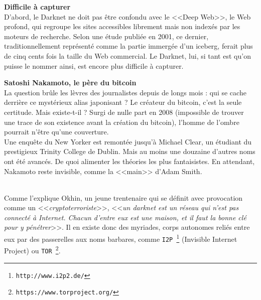 \documentclass[11pt,twoside,a4paper]{article}
\begin{document}
\begin{minipage}[ht]{0.40\textwidth}
	\textbf{\large Difficile {\`a} capturer}~\\

	D'abord, le Darknet ne doit pas {\^e}tre confondu avec le <<Deep Web>>, le Web profond, qui regroupe les sites accessibles librement mais non index{\'e}s par les moteurs de recherche. Selon une {\'e}tude publi{\'e}e en 2001, ce dernier, traditionnellement repr{\'e}sent{\'e} comme la partie immerg{\'e}e d'un iceberg, ferait plus de cinq cents fois la taille du Web commercial. Le Darknet, lui, si tant est qu'on puisse le nommer ainsi, est encore plus difficile {\`a} capturer. ~\\
\end{minipage} \hfill \colorbox{verylightgray}{%
	\begin{minipage}{0.50\textwidth}
		\footnotesize
		\textbf{\large Satoshi Nakamoto, le p{\`e}re du bitcoin}~\\

		La question br{\^u}le les l{\`e}vres des journalistes depuis de longs mois : qui se cache derri{\`e}re ce myst{\'e}rieux alias japonisant ? Le cr{\'e}ateur du bitcoin, c'est la seule certitude. Mais existe-t-il ? Surgi de nulle part en 2008 (impossible de trouver une trace de son existence avant la cr{\'e}ation du bitcoin), l'homme de l'ombre pourrait n'{\^e}tre qu'une couverture. ~\\

		Une enqu{\^e}te du New Yorker est remont{\'e}e jusqu'{\`a} Michael Clear, un {\'e}tudiant du prestigieux Trinity College de Dublin. Mais au moins une douzaine d'autres noms ont {\'e}t{\'e} avanc{\'e}s. De quoi alimenter les th{\'e}ories les plus fantaisistes. En attendant, Nakamoto reste invisible, comme la <<main>> d'Adam Smith. %
	\end{minipage}%
} \hfill ~\\

Comme l'explique Okhin, un jeune trentenaire qui se d{\'e}finit avec provocation comme un <<\emph{cryptoterroriste}>>, <<\emph{un darknet est un r{\'e}seau qui n'est pas connect{\'e} {\`a} Internet. Chacun d'entre eux est une maison, et il faut la bonne cl{\'e} pour y p{\'e}n{\'e}trer}>>. Il en existe donc des myriades, corps autonomes reli{\'e}s entre eux par des passerelles aux noms barbares, comme \texttt{I2P~\footnote{\texttt{http://www.i2p2.de/}}} (Invisible Internet Project) ou \texttt{TOR~\footnote{\texttt{https://www.torproject.org/}}}. ~\\
\end{document}
